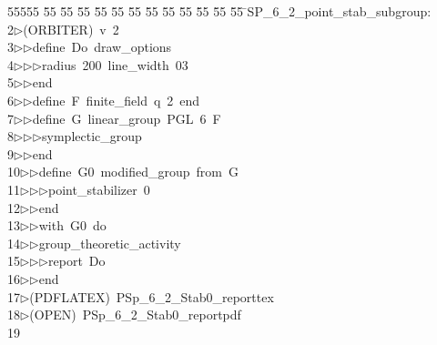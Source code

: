 %
%
\begin{tabbing}
55555 \= 55 \= 55 \= 55 \= 55 \= 55 \= 55 \= 55 \= 55 \= 55 \= 55 \= 55 \= 55 \= \>SP\_6\_2\_point\_stab\_subgroup:\\[0pt]
2\>$\triangleright$\>(ORBITER)\ v\ 2\ \\[0pt]
3\>$\triangleright$\>$\triangleright$\>define\ Do\ draw\_options\ \\[0pt]
4\>$\triangleright$\>$\triangleright$\>$\triangleright$\>radius\ 200\ line\_width\ 03\ \\[0pt]
5\>$\triangleright$\>$\triangleright$\>end\ \\[0pt]
6\>$\triangleright$\>$\triangleright$\>define\ F\ finite\_field\ q\ 2\ end\ \\[0pt]
7\>$\triangleright$\>$\triangleright$\>define\ G\ linear\_group\ PGL\ 6\ F\ \\[0pt]
8\>$\triangleright$\>$\triangleright$\>$\triangleright$\>symplectic\_group\ \\[0pt]
9\>$\triangleright$\>$\triangleright$\>end\ \\[0pt]
10\>$\triangleright$\>$\triangleright$\>define\ G0\ modified\_group\ from\ G\ \\[0pt]
11\>$\triangleright$\>$\triangleright$\>$\triangleright$\>point\_stabilizer\ 0\ \\[0pt]
12\>$\triangleright$\>$\triangleright$\>end\ \\[0pt]
13\>$\triangleright$\>$\triangleright$\>with\ G0\ do\ \\[0pt]
14\>$\triangleright$\>$\triangleright$\>group\_theoretic\_activity\ \\[0pt]
15\>$\triangleright$\>$\triangleright$\>$\triangleright$\>report\ Do\ \\[0pt]
16\>$\triangleright$\>$\triangleright$\>end\\[0pt]
17\>$\triangleright$\>(PDFLATEX)\ PSp\_6\_2\_Stab0\_reporttex\\[0pt]
18\>$\triangleright$\>(OPEN)\ PSp\_6\_2\_Stab0\_reportpdf\\[0pt]
19\>\end{tabbing}
